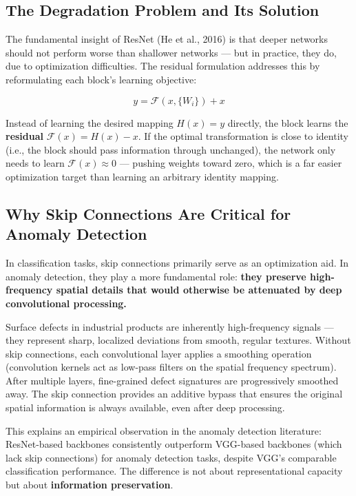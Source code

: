 \documentclass[12pt,a4paper,oneside]{report}
\begin{document}
\subsection{The Degradation Problem and Its Solution}

The fundamental insight of ResNet (He et al., 2016) is that deeper networks should not perform worse than shallower networks --- but in practice, they do, due to optimization difficulties. The residual formulation addresses this by reformulating each block's learning objective:

$$y = \mathcal{F}(x, \{W_i\}) + x$$

Instead of learning the desired mapping $H(x) = y$ directly, the block learns the \textbf{residual} $\mathcal{F}(x) = H(x) - x$. If the optimal transformation is close to identity (i.e., the block should pass information through unchanged), the network only needs to learn $\mathcal{F}(x) \approx 0$ --- pushing weights toward zero, which is a far easier optimization target than learning an arbitrary identity mapping.

\subsection{Why Skip Connections Are Critical for Anomaly Detection}

In classification tasks, skip connections primarily serve as an optimization aid. In anomaly detection, they play a more fundamental role: \textbf{they preserve high-frequency spatial details that would otherwise be attenuated by deep convolutional processing.}

Surface defects in industrial products are inherently high-frequency signals --- they represent sharp, localized deviations from smooth, regular textures. Without skip connections, each convolutional layer applies a smoothing operation (convolution kernels act as low-pass filters on the spatial frequency spectrum). After multiple layers, fine-grained defect signatures are progressively smoothed away. The skip connection provides an additive bypass that ensures the original spatial information is always available, even after deep processing.

This explains an empirical observation in the anomaly detection literature: ResNet-based backbones consistently outperform VGG-based backbones (which lack skip connections) for anomaly detection tasks, despite VGG's comparable classification performance. The difference is not about representational capacity but about \textbf{information preservation}.
\end{document}
